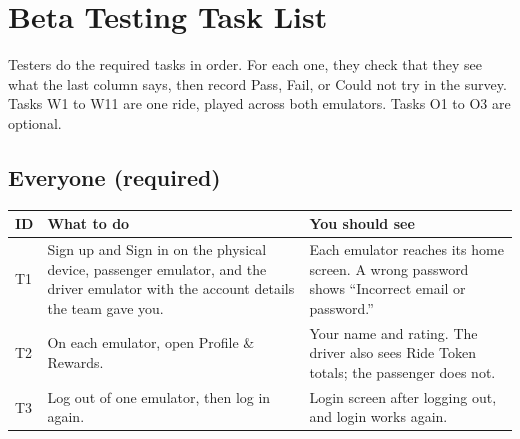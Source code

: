 \chapter{Beta Testing Task List}
\label{app:beta}
\clearpage

Testers do the required tasks in order. For each one, they check that they see what the last column says, then record Pass, Fail, or Could not try in the survey. Tasks W1 to W11 are one ride, played across both emulators. Tasks O1 to O3 are optional.

\section*{Everyone (required)}
\small
\begin{longtable}{|p{1.0cm}|p{7.2cm}|p{5.8cm}|}
\hline
\textbf{ID} & \textbf{What to do} & \textbf{You should see} \\
\hline
\endhead
T1 & Sign up and Sign in on the physical device, passenger emulator, and the driver emulator with the account details the team gave you. & Each emulator reaches its home screen. A wrong password shows ``Incorrect email or password.'' \\
\hline
T2 & On each emulator, open Profile \& Rewards. & Your name and rating. The driver also sees Ride Token totals; the passenger does not. \\
\hline
T3 & Log out of one emulator, then log in again. & Login screen after logging out, and login works again. \\
\hline
\end{longtable}
\normalsize

